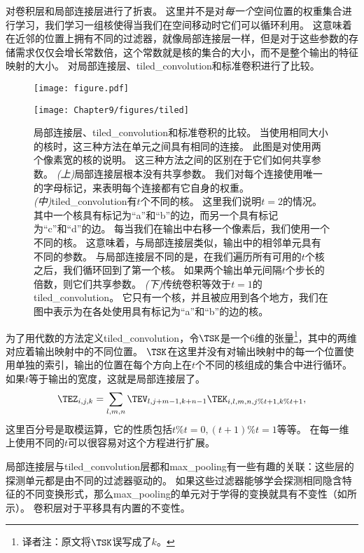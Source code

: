 \citep{Gregor+LeCun-2010,Le2010}对卷积层和局部连接层进行了折衷。
这里并不是对\emph{每一个}空间位置的权重集合进行学习，我们学习一组核使得当我们在空间移动时它们可以循环利用。
这意味着在近邻的位置上拥有不同的过滤器，就像局部连接层一样，但是对于这些参数的存储需求仅仅会增长常数倍，这个常数就是核的集合的大小，而不是整个输出的特征映射的大小。
对局部连接层、\gls{tiled_convolution}和标准卷积进行了比较。
\begin{figure}[!htb]
\ifOpenSource
\centerline{\texttt{[image: figure.pdf]}}
\else
\centerline{\texttt{[image: Chapter9/figures/tiled]}}
\fi
\captionsetup{singlelinecheck=off}
\caption[.]{局部连接层、\gls{tiled_convolution}和标准卷积的比较。
当使用相同大小的核时，这三种方法在单元之间具有相同的连接。
此图是对使用两个像素宽的核的说明。
这三种方法之间的区别在于它们如何共享参数。
\emph{(上)}局部连接层根本没有共享参数。
我们对每个连接使用唯一的字母标记，来表明每个连接都有它自身的权重。
\emph{(中)}\gls{tiled_convolution}有$t$个不同的核。
这里我们说明$t=2$的情况。
其中一个核具有标记为``a''和``b''的边，而另一个具有标记为``c''和``d''的边。
每当我们在输出中右移一个像素后，我们使用一个不同的核。
这意味着，与局部连接层类似，输出中的相邻单元具有不同的参数。
与局部连接层不同的是，在我们遍历所有可用的$t$个核之后，我们循环回到了第一个核。
如果两个输出单元间隔$t$个步长的倍数，则它们共享参数。
\emph{(下)}传统卷积等效于$t=1$的\gls{tiled_convolution}。
它只有一个核，并且被应用到各个地方，我们在图中表示为在各处使用具有标记为``a''和``b''的边的核。}
\label{fig:chap9_tiled}
\end{figure}
 
 
为了用代数的方法定义\gls{tiled_convolution}，令$\TSK$是一个6维的张量\footnote{译者注：原文将$\TSK$误写成了$k$。}，其中的两维对应着输出映射中的不同位置。
$\TSK$在这里并没有对输出映射中的每一个位置使用单独的索引，输出的位置在每个方向上在$t$个不同的核组成的集合中进行循环。
如果$t$等于输出的宽度，这就是局部连接层了。
\begin{equation}
\TEZ_{i, j, k} = \sum_{l, m, n} \TEV_{l, j+m-1, k+n-1} \TEK_{i, l, m, n, j\% t +1, k\% t+1},
\end{equation}
这里百分号是取模运算，它的性质包括$t\% t =0, (t+1)\% t = 1$等等。
在每一维上使用不同的$t$可以很容易对这个方程进行扩展。
 
  
 
局部连接层与\gls{tiled_convolution}层都和\gls{max_pooling}有一些有趣的关联：这些层的探测单元都是由不同的过滤器驱动的。
如果这些过滤器能够学会探测相同隐含特征的不同变换形式，那么\gls{max_pooling}的单元对于学得的变换就具有不变性（如所示）。
卷积层对于平移具有内置的不变性。
 
